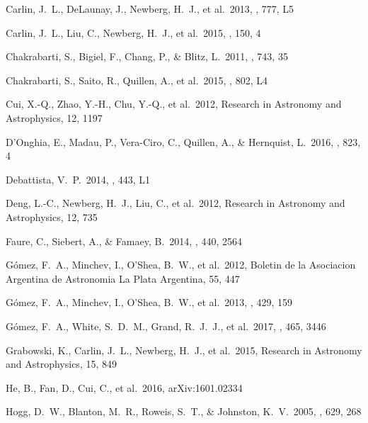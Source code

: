 \documentclass[11pt,preprint]{aastex6}
\begin{document}

\begin{thebibliography}{}

 Carlin, J.~L., DeLaunay, J., Newberg, H.~J., et al.\ 2013, \apjl, 777, L5

 Carlin, J.~L., Liu, C., Newberg, H.~J., et al.\ 2015, \aj, 150, 4

 Chakrabarti, S., Bigiel, F., Chang, P., \& Blitz, L.\ 2011, \apj, 743, 35

 Chakrabarti, S., Saito, R., Quillen, A., et al.\ 2015, \apjl, 802, L4

 Cui, X.-Q., Zhao, Y.-H., Chu, Y.-Q., et al.\ 2012, Research in Astronomy and Astrophysics, 12, 1197

 D'Onghia, E., Madau, P., Vera-Ciro, C., Quillen, A., \& Hernquist, L.\ 2016, \apj, 823, 4

 Debattista, V.~P.\ 2014, \mnras, 443, L1

 Deng, L.-C., Newberg, H.~J., Liu, C., et al.\ 2012, Research in Astronomy and Astrophysics, 12, 735

 Faure, C., Siebert, A., \& Famaey, B.\ 2014, \mnras, 440, 2564

 G{\'o}mez, F.~A., Minchev, I., O'Shea, B.~W., et al.\ 2012, Boletin de la Asociacion Argentina de Astronomia La Plata Argentina, 55, 447

 G{\'o}mez, F.~A., Minchev, I., O'Shea, B.~W., et al.\ 2013, \mnras, 429, 159

 G{\'o}mez, F.~A., White, S.~D.~M., Grand, R.~J.~J., et al.\ 2017, \mnras, 465, 3446

 Grabowski, K., Carlin, J.~L., Newberg, H.~J., et al.\ 2015, Research in Astronomy and Astrophysics, 15, 849

 He, B., Fan, D., Cui, C., et al.\ 2016, arXiv:1601.02334

 Hogg, D.~W., Blanton, M.~R., Roweis, S.~T., \& Johnston, K.~V.\ 2005, \apj, 629, 268


\end{thebibliography}
\end{document}
